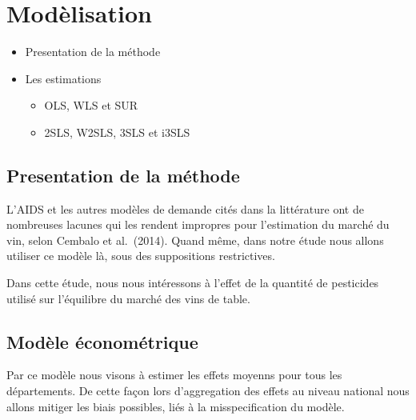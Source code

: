 \documentclass[11pt,]{article}
\providecommand{\tightlist}{%
  \setlength{\itemsep}{0pt}\setlength{\parskip}{0pt}}
\begin{document}
\FloatBarrier

\hypertarget{modelisation}{%
\section{Modèlisation}\label{modelisation}}

\begin{itemize}
\tightlist
\item
  Presentation de la méthode
\item
  Les estimations

  \begin{itemize}
  \tightlist
  \item
    OLS, WLS et SUR
  \item
    2SLS, W2SLS, 3SLS et i3SLS
  \end{itemize}
\end{itemize}

\hypertarget{presentation-de-la-methode}{%
\subsection{Presentation de la
méthode}\label{presentation-de-la-methode}}

L'AIDS et les autres modèles de demande cités dans la littérature ont de
nombreuses lacunes qui les rendent impropres pour l'estimation du marché
du vin, selon Cembalo et al.~(2014). Quand même, dans notre étude nous
allons utiliser ce modèle là, sous des suppositions restrictives.

\par

Dans cette étude, nous nous intéressons à l'effet de la quantité de
pesticides utilisé sur l'équilibre du marché des vins de table.

\hypertarget{modele-econometrique}{%
\subsection{Modèle économétrique}\label{modele-econometrique}}

Par ce modèle nous visons à estimer les effets moyenns pour tous les
départements. De cette façon lors d'aggregation des effets au niveau
national nous allons mitiger les biais possibles, liés à la
misspecification du modèle.

\par
\end{document}
